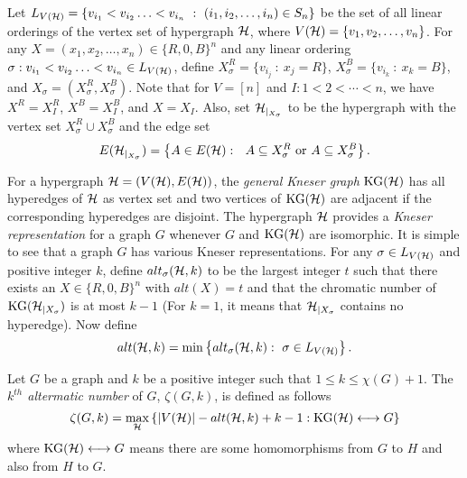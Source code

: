 \documentclass[11pt]{article}
\begin{document}
Let $L_{V({\cal H})}=\{v_{i_1}<v_{i_2}\ldots<v_{i_n}\ :\ (i_1,i_2,\ldots,i_n)\in S_n\}$ be the set of all linear orderings of
the vertex set of hypergraph ${\cal H}$, where $V({\cal H})=\{v_1,v_2,\ldots,v_n\}$.
For any $X=(x_1,x_2,\ldots,x_n)\in \{R, 0, B\}^n$ and any linear ordering
$\sigma: v_{i_1}<v_{i_2}\ldots<v_{i_n}\in L_{V({\cal H})}$, define $X^R_\sigma=\{v_{i_j}\ :\ x_j=R\}$,  $X^B_\sigma=\{v_{i_k}\ :\ x_k=B\}$, and $X_\sigma=(X^R_\sigma,X^B_\sigma)$.
Note that for $V=[n]$ and $I:1<2<\cdots<n$, we have $X^R=X^R_I$, $X^B=X^B_I$, and $X=X_I$.
Also, set ${\cal H}_{|_{X_\sigma}}$ to be the hypergraph with the vertex set $X^R_\sigma\cup X^B_\sigma$  and the edge set
$$E({\cal H}_{|_{X_\sigma}})=\left\{A\in E({\cal H}):\  \ A\subseteq X^R_\sigma\ {\rm or}\ A\subseteq X^B_\sigma\right\}.$$

For a hypergraph ${\cal H}=(V({\cal H}),E({\cal H}))$, the {\it general Kneser graph} ${\rm KG}({\cal H})$ has all hyperedges of
${\cal H}$ as vertex set and two vertices of ${\rm KG}({\cal H})$ are adjacent if the corresponding hyperedges are disjoint.
The hypergraph ${\cal H}$ provides a {\it Kneser representation} for a graph $G$ whenever $G$ and ${\rm KG}({\cal H})$ are isomorphic. It is simple to see that a graph $G$ has various Kneser representations.
For any $\sigma\in L_{V({\cal H})}$ and positive integer $k$,
define $alt_\sigma({\cal H}, k)$
to be the largest integer $t$ such that there exists an
$X\in\{R,0,B\}^n$ with  $alt(X)=t$
and that the chromatic number of  ${\rm KG}({\cal H}_{|X_\sigma})$ is at most $k-1$ (For $k=1$, it means that ${\cal H}_{|X_\sigma}$ contains no
hyperedge). Now define $$alt({\cal H},k)=\min\left\{alt_\sigma({\cal H},k):\ \sigma\in L_{V({\cal H})}\right\}.$$

Let $G$ be a graph and $k$ be a positive
integer such that $1\leq k\leq\chi(G)+1$.
The {\it $k^{th}$ altermatic number} of $G$, $\zeta(G,k)$, is defined as follows
$$
\zeta(G,k)=\displaystyle\max_{{\cal H}}
\left\{|V({\cal H})|-alt({\cal H},k)+k-1: {\rm KG}({\cal H})\longleftrightarrow G\right\}
$$
where ${\rm KG}({\cal H})\longleftrightarrow G$ means there are some homomorphisms from $G$ to $H$ and also from $H$ to $G$.
\end{document}

